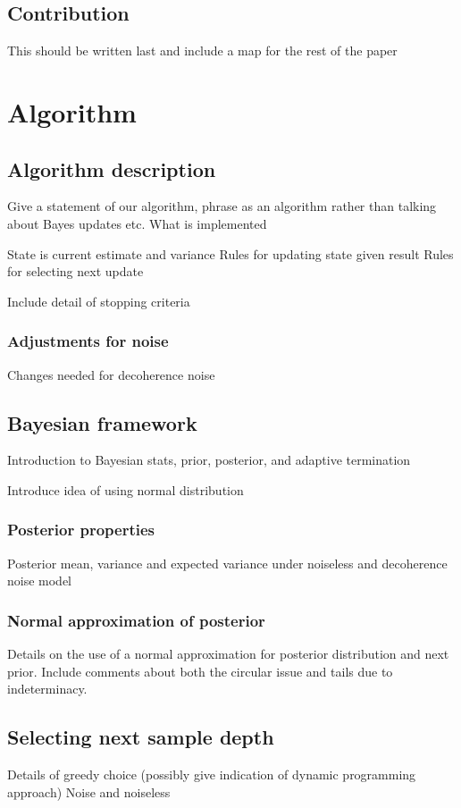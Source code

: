 \documentclass[a4paper,onecolumn,11pt,unpublished]{quantumarticle}
\begin{document}
\subsection{Contribution}
This should be written last and include a map for the rest of the paper


\section{Algorithm}

\subsection{Algorithm description}
Give a statement of our algorithm, phrase as an algorithm rather than talking about Bayes updates etc. What is implemented

State is current estimate and variance
Rules for updating state given result
Rules for selecting next update

Include detail of stopping criteria

\subsubsection{Adjustments for noise}
Changes needed for decoherence noise

\subsection{Bayesian framework}
Introduction to Bayesian stats, prior, posterior, and adaptive termination

Introduce idea of using normal distribution 


\subsubsection{Posterior properties}
Posterior mean, variance and expected variance under noiseless and decoherence noise model

\subsubsection{Normal approximation of posterior}
Details on the use of a normal approximation for posterior distribution and next prior.
Include comments about both the circular issue and tails due to indeterminacy. 

\subsection{Selecting next sample depth}
Details of greedy choice (possibly give indication of dynamic programming approach)
Noise and noiseless
\end{document}
